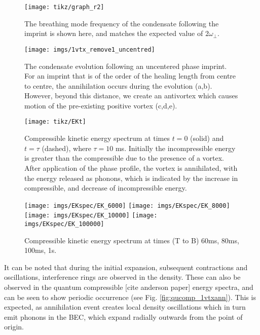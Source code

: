 \begin{figure}
    \texttt{[image: tikz/graph\_r2]}
    \caption{The breathing mode frequency of the condensate following the imprint is shown here, and matches the expected value of $2\omega_\perp$.}\label{fig:breathing}
\end{figure}


\begin{figure}
    \texttt{[image: imgs/1vtx\_remove1\_uncentred]}%
    \caption{The condensate evolution following an uncentered phase imprint. For an imprint that is of the order of the healing length from centre to centre, the annihilation occurs during the evolution (a,b). However, beyond this distance, we create an antivortex which causes motion of the pre-existing positive vortex (c,d,e).}\label{fig:annihilation_1vtx_uncentred}
\end{figure}
\begin{figure}[tb]
    \texttt{[image: tikz/EKt]}
    \caption{Compressible kinetic energy spectrum at times $t=0$ (solid) and $t=\tau$ (dashed), where $\tau=10$ ms.
    Initially the incompressible energy is greater than the compressible due to the presence of a vortex. After application of the phase profile, the vortex is annihilated, with the energy released as phonons, which is indicated by the increase in compressible, and decrease of incompressible energy.}
\end{figure}



\begin{figure}[bt]
\texttt{[image: imgs/EKspec/EK\_6000]}
\texttt{[image: imgs/EKspec/EK\_8000]}
\texttt{[image: imgs/EKspec/EK\_10000]}
\texttt{[image: imgs/EKspec/EK\_100000]}
    \caption{Compressible kinetic energy spectrum at times (T to B) 60ms, 80ms, 100ms, 1s.}
\end{figure}

It can be noted that during the initial expansion, subsequent contractions and oscillations, interference rings are observed in the density. These can also be observed in the quantum compressible [cite anderson paper] energy spectra, and can be seen to show periodic occurrence (see Fig. \ref{fig:qucomp_1vtxann}). This is expected, as annihilation event creates local density oscillations which in turn emit phonons in the BEC, which expand radially outwards from the point of origin.


